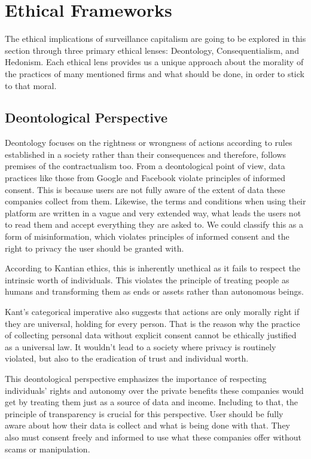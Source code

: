 \section{Ethical Frameworks}\label{sec:ethical-frameworks}
The ethical implications of surveillance capitalism are going to be explored in this section through three primary ethical lenses: Deontology, Consequentialism, and Hedonism.
Each ethical lens provides us a unique approach about the morality of the practices of many mentioned firms and what should be done, in order to stick to that moral.

\subsection{Deontological Perspective}\label{subsec:deontological-perspective}
Deontology focuses on the rightness or wrongness of actions according to rules established in a society rather than their consequences and therefore, follows premises of the contractualism too.
From a deontological point of view, data practices like those from Google and Facebook violate principles of informed consent.
This is because users are not fully aware of the extent of data these companies collect from them.
Likewise, the terms and conditions when using their platform are written in a vague and very extended way, what leads the users not to read them and accept everything they are asked to.
We could classify this as a form of misinformation, which violates principles of informed consent and the right to privacy the user should be granted with.

According to Kantian ethics, this is inherently unethical as it fails to respect the intrinsic worth of individuals\cite{Kant1998_Groundwork}.
This violates the principle of treating people as humans and transforming them as ends or assets rather than autonomous beings.

Kant’s categorical imperative also suggests that actions are only morally right if they are universal, holding for every person.
That is the reason why the practice of collecting personal data without explicit consent cannot be ethically justified as a universal law.
It wouldn't lead to a society where privacy is routinely violated, but also to the eradication of trust and individual worth.

This deontological perspective emphasizes the importance of respecting individuals' rights and autonomy over the private benefits these companies would get by treating them just as a source of data and income.
Including to that, the principle of transparency is crucial for this perspective.
User should be fully aware about how their data is collect and what is being done with that.
They also must consent freely and informed to use what these companies offer without scams or manipulation.

